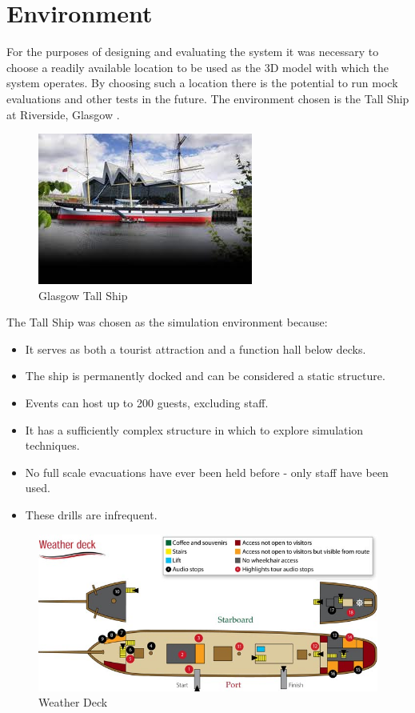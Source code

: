 \section{Environment}
For the purposes of designing and evaluating the system it was necessary to choose a readily available location to be used as the 3D model with which the system operates. By choosing such a location there is the potential to run mock evaluations and other tests in the future. The environment chosen is the Tall Ship at Riverside, Glasgow \cite{TallShipSite}.

\begin{figure}
\centering
\includegraphics{../images/glasgowTallShip.jpg}
\caption{Glasgow Tall Ship}
\end{figure}

The Tall Ship was chosen as the simulation environment because:
\begin{itemize}
 \item It serves as both a tourist attraction and a function hall below decks.
 \item The ship is permanently docked and can be considered a static structure.
 \item Events can host up to 200 guests, excluding staff.
 \item It has a sufficiently complex structure in which to explore simulation techniques.
 \item No full scale evacuations have ever been held before - only staff have been used.
 \item These drills are infrequent.
\end{itemize}

\begin{figure}
\centering
\includegraphics[scale=0.4]{../images/weatherdeck.jpg}
\caption{Weather Deck}
\end{figure}

